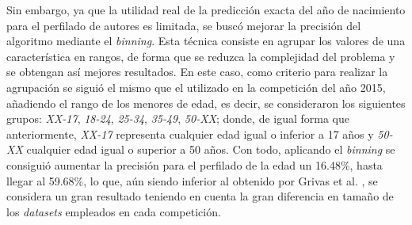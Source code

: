 \bigskip
\begin{table}[H]
	\centering
	\caption{Resultados de las pruebas realizadas con el algoritmo de Martinc et al. \cite{martinc2019hot}}
	\label{tab:pruebas_martinc}
\end{table}

Sin embargo, ya que la utilidad real de la predicción exacta del año de nacimiento para el perfilado de autores es limitada,
se buscó mejorar la precisión del algoritmo mediante el \textit{binning}. Esta técnica consiste en agrupar los valores de una característica en rangos, de forma que
se reduzca la complejidad del problema y se obtengan así mejores resultados. En este caso, como criterio para realizar la agrupación se siguió el mismo que el utilizado
en la competición del año 2015, añadiendo el rango de los menores de edad, es decir, se consideraron los siguientes grupos: \textit{XX-17}, \textit{18-24}, \textit{25-34}, \textit{35-49}, \textit{50-XX};
donde, de igual forma que anteriormente, \textit{XX-17} representa cualquier edad igual o inferior a 17 años y \textit{50-XX} cualquier edad igual o superior a 50 años.
Con todo, aplicando el \textit{binning} se consiguió aumentar la precisión para el perfilado de la edad un 16.48\%, hasta llegar al 59.68\%, lo que, aún siendo inferior
al obtenido por Grivas et al. \cite{grivas2015author}, se considera un gran resultado teniendo en cuenta la gran diferencia en tamaño de los \textit{datasets} empleados en
cada competición.
